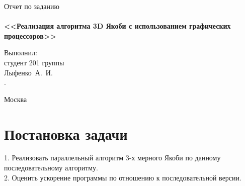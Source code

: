 \documentclass[a4paper,12pt,titlepage,draft]{article}
\begin{document}
\begin{titlepage}
    \begin{center}
	{\Large \sc Отчет по заданию}\\
	~\\
	{\large \bf <<Реализация алгоритма 3D Якоби с использованием графических процессоров>>}\\ 
    \end{center}
    \begin{flushright}
	\vfill {Выполнил:\\
	студент 201 группы\\
	Лыфенко~А.~И.\\.}
    \end{flushright}
    \begin{center}
	\vfill
	{\small Москва\\ \the\year{}}
    \end{center}
\end{titlepage}

\section{Постановка задачи}
1. Реализовать параллельный алгоритм 3-х мерного Якоби по данному последовательному алгоритму.\\

2. Оценить ускорение программы по отношению к последовательной версии.\\
\newpage
\end{document}
